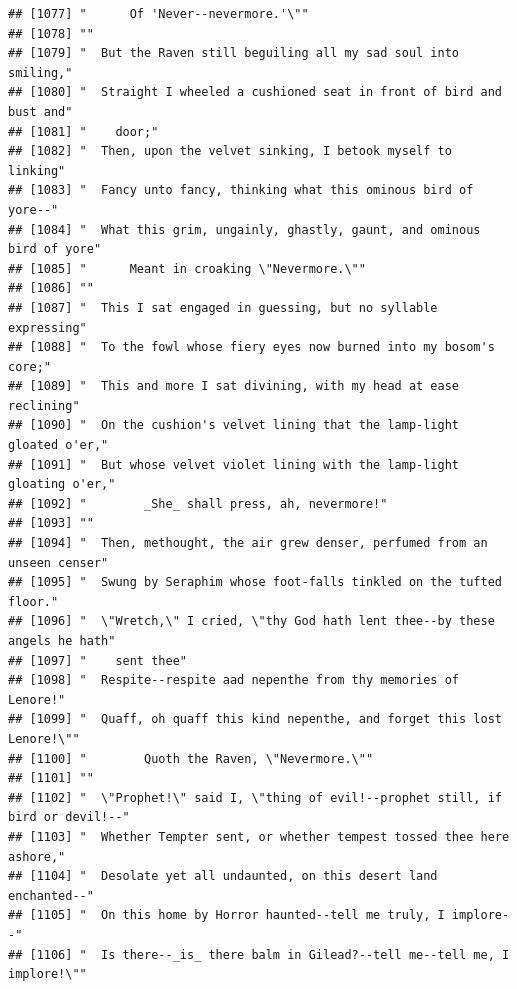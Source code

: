 \documentclass{article}\usepackage[]{graphicx}\usepackage[]{color}
\makeatletter
\newenvironment{kframe}{%
 \def\at@end@of@kframe{}%
 \ifinner\ifhmode%
  \def\at@end@of@kframe{\end{minipage}}%
  \begin{minipage}{\columnwidth}%
 \fi\fi%
 \def\FrameCommand##1{\hskip\@totalleftmargin \hskip-\fboxsep
 \colorbox{shadecolor}{##1}\hskip-\fboxsep
     \hskip-\linewidth \hskip-\@totalleftmargin \hskip\columnwidth}%
 \MakeFramed {\advance\hsize-\width
   \@totalleftmargin\z@ \linewidth\hsize
   \@setminipage}}%
 {\par\unskip\endMakeFramed%
 \at@end@of@kframe}
\newenvironment{knitrout}{}{} %
\makeatother
\begin{document}
\begin{knitrout}
\begin{kframe}
\begin{verbatim}
## [1077] "      Of 'Never--nevermore.'\""                                              
## [1078] ""                                                                            
## [1079] "  But the Raven still beguiling all my sad soul into smiling,"               
## [1080] "  Straight I wheeled a cushioned seat in front of bird and bust and"         
## [1081] "    door;"                                                                   
## [1082] "  Then, upon the velvet sinking, I betook myself to linking"                 
## [1083] "  Fancy unto fancy, thinking what this ominous bird of yore--"               
## [1084] "  What this grim, ungainly, ghastly, gaunt, and ominous bird of yore"        
## [1085] "      Meant in croaking \"Nevermore.\""                                      
## [1086] ""                                                                            
## [1087] "  This I sat engaged in guessing, but no syllable expressing"                
## [1088] "  To the fowl whose fiery eyes now burned into my bosom's core;"             
## [1089] "  This and more I sat divining, with my head at ease reclining"              
## [1090] "  On the cushion's velvet lining that the lamp-light gloated o'er,"          
## [1091] "  But whose velvet violet lining with the lamp-light gloating o'er,"         
## [1092] "        _She_ shall press, ah, nevermore!"                                   
## [1093] ""                                                                            
## [1094] "  Then, methought, the air grew denser, perfumed from an unseen censer"      
## [1095] "  Swung by Seraphim whose foot-falls tinkled on the tufted floor."           
## [1096] "  \"Wretch,\" I cried, \"thy God hath lent thee--by these angels he hath"    
## [1097] "    sent thee"                                                               
## [1098] "  Respite--respite aad nepenthe from thy memories of Lenore!"                
## [1099] "  Quaff, oh quaff this kind nepenthe, and forget this lost Lenore!\""        
## [1100] "        Quoth the Raven, \"Nevermore.\""                                     
## [1101] ""                                                                            
## [1102] "  \"Prophet!\" said I, \"thing of evil!--prophet still, if bird or devil!--" 
## [1103] "  Whether Tempter sent, or whether tempest tossed thee here ashore,"         
## [1104] "  Desolate yet all undaunted, on this desert land enchanted--"               
## [1105] "  On this home by Horror haunted--tell me truly, I implore--"                
## [1106] "  Is there--_is_ there balm in Gilead?--tell me--tell me, I implore!\""      

\end{verbatim}
\end{kframe}
\end{knitrout}
\end{document}
